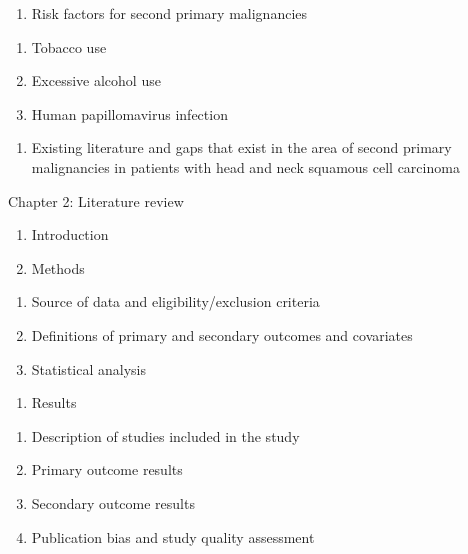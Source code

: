\documentclass[12pt]{book}
\numberwithin{equation}{chapter}
\providecommand{\tightlist}{%
  \setlength{\itemsep}{0pt}\setlength{\parskip}{0pt}}
\begin{document}
\begin{enumerate}
\def\labelenumi{\Alph{enumi}.}
\setcounter{enumi}{1}
\tightlist
\item
  Risk factors for second primary malignancies
\end{enumerate}

\begin{enumerate}
\def\labelenumi{\arabic{enumi}.}
\tightlist
\item
  Tobacco use
\item
  Excessive alcohol use
\item
  Human papillomavirus infection
\end{enumerate}

\begin{enumerate}
\def\labelenumi{\Alph{enumi}.}
\setcounter{enumi}{2}
\tightlist
\item
  Existing literature and gaps that exist in the area of second primary malignancies in patients with head and neck squamous cell carcinoma
\end{enumerate}

Chapter 2: Literature review

\begin{enumerate}
\def\labelenumi{\Alph{enumi}.}
\item
  Introduction
\item
  Methods
\end{enumerate}

\begin{enumerate}
\def\labelenumi{\arabic{enumi}.}
\tightlist
\item
  Source of data and eligibility/exclusion criteria
\item
  Definitions of primary and secondary outcomes and covariates
\item
  Statistical analysis
\end{enumerate}

\begin{enumerate}
\def\labelenumi{\Alph{enumi}.}
\setcounter{enumi}{2}
\tightlist
\item
  Results
\end{enumerate}

\begin{enumerate}
\def\labelenumi{\arabic{enumi}.}
\tightlist
\item
  Description of studies included in the study
\item
  Primary outcome results
\item
  Secondary outcome results
\item
  Publication bias and study quality assessment
\end{enumerate}
\end{document}
